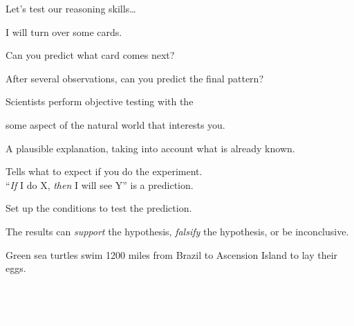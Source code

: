 \documentclass[t,handout]{beamer}  %
\begin{document}
\begin{frame}{Let's test our reasoning skills\dots}

	\hangpara I will turn over some cards.
	
	\hangpara Can you predict what card comes next?
	
	\hangpara After several observations, can you predict the final pattern?

\end{frame}


\begin{frame}[t]{Scientists perform objective testing with the }

	\hangpara {} some aspect of the natural world that interests you.
	\pause

	\hangpara {} A plausible explanation, taking into account what is already known.
	\pause
	
	\hangpara {} Tells what to expect if you do the experiment.\\ “\textit{If} I do X, \textit{then} I will see Y” is a prediction.
	\pause
	
	\hangpara {} Set up the conditions to test the prediction.
	\pause
	
	\hangpara {} The results can \textit{support} the hypothesis, \textit{falsify} the hypothesis, or be inconclusive.

\end{frame}


{
\begin{frame}[b,plain]{ Green sea turtles swim 1200 miles from Brazil to Ascension Island to lay their eggs.}

\hfill\tiny\textcolor{white}{Laszlo Ilyes, Flickr, }
\end{frame}
}

{
\begin{frame}[b]

\hfill\tiny\textcolor{white}{Modified from Strebe, Wikimedia, }
\end{frame}
}
\end{document}
